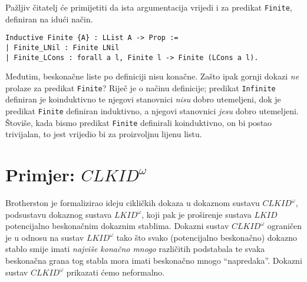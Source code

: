 Pažljiv čitatelj će primijetiti da ista argumentacija vrijedi
i za predikat \texttt{Finite}, definiran na idući način.
\begin{verbatim}
Inductive Finite {A} : LList A -> Prop :=
| Finite_LNil : Finite LNil
| Finite_LCons : forall a l, Finite l -> Finite (LCons a l).
\end{verbatim}
\noindent Međutim, beskonačne liste po definiciji nisu konačne.
Zašto ipak gornji dokazi \textit{ne} prolaze za predikat \texttt{Finite}?
Riječ je o načinu definicije; predikat \texttt{Infinite} definiran je koinduktivno
te njegovi stanovnici \textit{nisu} dobro utemeljeni,
dok je predikat \texttt{Finite} definiran induktivno, a njegovi stanovnici \textit{jesu}
dobro utemeljeni. Štoviše, kada bismo predikat \texttt{Finite} definirali koinduktivno,
on bi postao trivijalan, to jest vrijedio bi za proizvoljnu lijenu listu.

\section{Primjer: \(\mathit{CLKID}^{\omega}\)}
Brotherston je formalizirao ideju cikličkih dokaza u dokaznom sustavu
\(\mathit{CLKID}^{\omega}\), podsustavu dokaznog sustava \(\mathit{LKID}^{\omega}\),
koji pak je proširenje sustava \(\mathit{LKID}\) potencijalno beskonačnim dokaznim stablima.
Dokazni sustav \(\mathit{CLKID}^{\omega}\) ograničen je u odnosu na sustav \(\mathit{LKID}^{\omega}\)
tako što svako (potencijalno beskonačno) dokazno stablo
smije imati \textit{najviše konačno mnogo} različitih podstabala te
svaka beskonačna grana tog stabla mora imati beskonačno mnogo \enquote{napredaka}.
Dokazni sustav \(\mathit{CLKID}^{\omega}\) prikazati ćemo neformalno.

